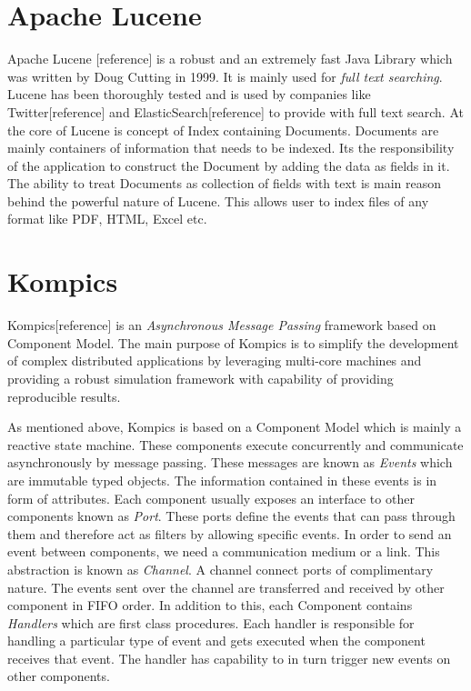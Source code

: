 \documentclass[12pt,a4paper,twoside,openright]{book}
\begin{document}
\section{Apache Lucene}

Apache Lucene [reference] is a robust and an extremely fast Java Library which was written by Doug Cutting in 1999. It is mainly used for \textit{full text searching}. Lucene has been thoroughly tested and is used by companies like Twitter[reference] and ElasticSearch[reference] to provide with full text search. At the core of Lucene is concept of Index containing Documents. Documents are mainly containers of information that needs to be indexed. Its the responsibility of the application to construct the Document by adding the data as fields in it. The ability to treat Documents as collection of fields with text is main reason behind the powerful nature of Lucene. This allows user to index files of any format like PDF, HTML, Excel etc. 

\section{Kompics}
Kompics[reference] is an \textit{Asynchronous Message Passing} framework based on Component Model. The main purpose of Kompics is to simplify the development of complex distributed applications by leveraging multi-core machines and providing a robust simulation framework with capability of providing reproducible results. 
\par As mentioned above, Kompics is based on a Component Model which is mainly a reactive state machine. These components execute concurrently and communicate asynchronously by message passing. These messages are known as \textit{Events} which are immutable typed objects. The information contained in these events is in form of attributes. Each component usually exposes an interface to other components known as \textit{Port}. These ports define the events that can pass through them and therefore act as filters by allowing specific events. In order to send an event between components, we need a communication medium or a link. This abstraction is known as \textit{Channel}. A channel connect ports of complimentary nature. The events sent over the channel are transferred and received by other component in FIFO order. In addition to this, each Component contains \textit{Handlers} which are first class procedures. Each handler is responsible for handling a particular type of event and gets executed when the component receives that event. The handler has capability to in turn trigger new events on other components. 
\end{document}
